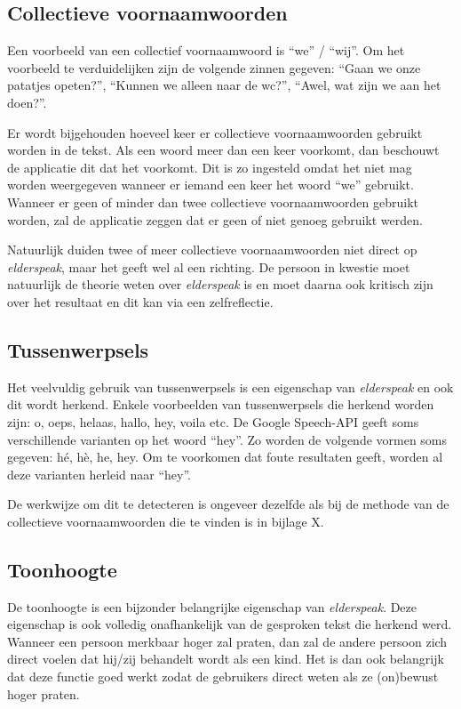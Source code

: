 \subsection{Collectieve voornaamwoorden}
Een voorbeeld van een collectief voornaamwoord is ``we'' / ``wij''. Om het voorbeeld te verduidelijken zijn de volgende zinnen gegeven: ``Gaan we onze patatjes opeten?'', ``Kunnen we alleen naar de wc?'', ``Awel, wat zijn we aan het doen?''.

Er wordt bijgehouden hoeveel keer er collectieve voornaamwoorden gebruikt worden in de tekst. Als een woord meer dan een keer voorkomt, dan beschouwt de applicatie dit dat het voorkomt. Dit is zo ingesteld omdat het niet mag worden weergegeven wanneer er iemand een keer het woord ``we'' gebruikt.
Wanneer er geen of minder dan twee collectieve voornaamwoorden gebruikt worden, zal de applicatie zeggen dat er geen of niet genoeg gebruikt werden.

Natuurlijk duiden twee of meer collectieve voornaamwoorden niet direct op \textit{elderspeak}, maar het geeft wel al een richting. De persoon in kwestie moet natuurlijk de theorie weten over \textit{elderspeak} is en moet daarna ook kritisch zijn over het resultaat en dit kan via een zelfreflectie.

\subsection{Tussenwerpsels}
Het veelvuldig gebruik van tussenwerpsels is een eigenschap van \textit{elderspeak} en ook dit wordt herkend. Enkele voorbeelden van tussenwerpsels die herkend worden zijn: o, oeps, helaas, hallo, hey, voila etc. De Google Speech-API geeft soms verschillende varianten op het woord ``hey''. Zo worden de volgende vormen soms gegeven: hé, hè, he, hey. Om te voorkomen dat foute resultaten geeft, worden al deze varianten herleid naar ``hey''.

De werkwijze om dit te detecteren is ongeveer dezelfde als bij de methode van de collectieve voornaamwoorden die te vinden is in bijlage X.

\subsection{Toonhoogte}
De toonhoogte is een bijzonder belangrijke eigenschap van \textit{elderspeak}. Deze eigenschap is ook volledig onafhankelijk van de gesproken tekst die herkend werd. Wanneer een persoon merkbaar hoger zal praten, dan zal de andere persoon zich direct voelen dat hij/zij behandelt wordt als een kind. Het is dan ook belangrijk dat deze functie goed werkt zodat de gebruikers direct weten als ze (on)bewust hoger praten.

